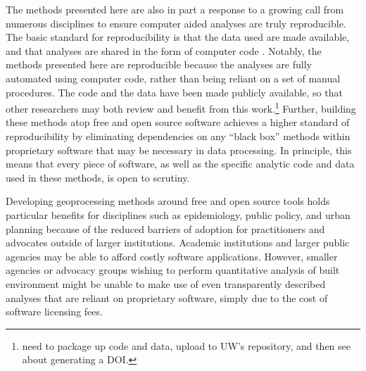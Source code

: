 \documentclass[11pt,letterpaper]{article} %
\begin{document}
The methods presented here are also in part a response to a growing
call from numerous disciplines to ensure computer aided
analyses are truly reproducible. The basic standard for reproducibility is
that the data used are made available, and that analyses are shared in the
form of computer code \parencite{Peng2011computational}. Notably, the
methods presented here are reproducible because the analyses are fully
automated using computer code, rather than being reliant on a set of
manual procedures. The code and the data have been made publicly
available, so that other researchers may both review and benefit from this work.\footnote{need to package up code and data, upload to UW's
  repository, and then see about generating a DOI.}  Further, building
these methods atop free and open source software achieves a higher
standard of reproducibility by eliminating dependencies on any ``black
box'' methods within proprietary software that may be necessary in data processing. In principle, this means that every piece of
software, as well as the specific analytic code and data used in these methods, is open to scrutiny.

Developing geoprocessing methods around free and open source tools
holds particular benefits for disciplines such as epidemiology, public
policy, and urban planning because of the reduced barriers of adoption
for practitioners and advocates outside of larger institutions. Academic
institutions and larger public agencies may be able to afford costly software
applications. However, smaller agencies or advocacy groups wishing to
perform quantitative analysis of built environment might be unable to
make use of even transparently described analyses that are reliant on proprietary software, simply due to the
cost of software licensing fees.
\end{document}
